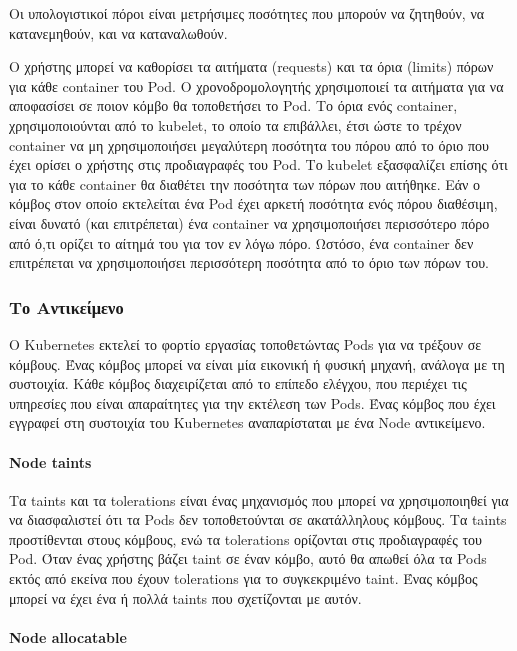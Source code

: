 Οι υπολογιστικοί πόροι είναι μετρήσιμες ποσότητες που μπορούν να ζητηθούν, να
κατανεμηθούν, και να καταναλωθούν.

Ο χρήστης μπορεί να καθορίσει τα αιτήματα (requests) και τα όρια (limits) πόρων
για κάθε container του Pod. Ο χρονοδρομολογητής χρησιμοποιεί τα αιτήματα για να
αποφασίσει σε ποιον κόμβο θα τοποθετήσει το Pod. Το όρια ενός container,
χρησιμοποιούνται από το kubelet, το οποίο τα επιβάλλει, έτσι ώστε το τρέχον
container να μη χρησιμοποιήσει μεγαλύτερη ποσότητα του πόρου  από το όριο που
έχει ορίσει ο χρήστης στις προδιαγραφές του Pod. Το kubelet εξασφαλίζει επίσης
ότι για το κάθε container θα διαθέτει την ποσότητα των πόρων που αιτήθηκε. Εάν
ο κόμβος στον οποίο εκτελείται ένα Pod έχει αρκετή ποσότητα ενός πόρου
διαθέσιμη, είναι δυνατό (και επιτρέπεται) ένα container να χρησιμοποιήσει
περισσότερο πόρο από ό,τι ορίζει το αίτημά του για τον εν λόγω πόρο. Ωστόσο, ένα
container δεν επιτρέπεται να χρησιμοποιήσει περισσότερη ποσότητα από το όριο των
πόρων του.



\subsubsection{Το Αντικείμενο } Ο Kubernetes εκτελεί το φορτίο εργασίας
τοποθετώντας Pods για να τρέξουν σε κόμβους. Ένας κόμβος μπορεί να είναι μία
εικονική ή φυσική μηχανή, ανάλογα με τη συστοιχία. Κάθε κόμβος διαχειρίζεται από
το επίπεδο ελέγχου, που περιέχει τις υπηρεσίες που είναι απαραίτητες για την
εκτέλεση των Pods. Ένας κόμβος που έχει εγγραφεί στη συστοιχία του Kubernetes
αναπαρίσταται με ένα Node αντικείμενο.

\paragraph*{Node taints}
Τα taints και τα tolerations είναι ένας μηχανισμός που μπορεί να χρησιμοποιηθεί
για να διασφαλιστεί ότι τα Pods δεν τοποθετούνται σε ακατάλληλους κόμβους.
Τα taints προστίθενται στους κόμβους, ενώ τα tolerations ορίζονται στις
προδιαγραφές του Pod. Όταν ένας χρήστης βάζει taint σε έναν κόμβο, αυτό θα
απωθεί όλα τα Pods εκτός από εκείνα που έχουν tolerations για το συγκεκριμένο
taint. Ένας κόμβος μπορεί να έχει ένα ή πολλά taints που σχετίζονται με αυτόν.

\paragraph*{Node allocatable}

